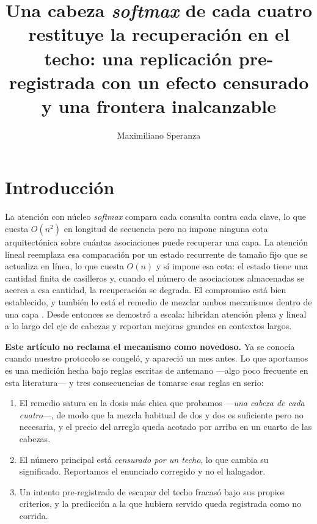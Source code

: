 \documentclass[jou,11pt,donotrepeattitle]{apa7}
\title{Una cabeza \emph{softmax} de cada cuatro restituye la recuperaci\'on en el techo:
una replicaci\'on pre-registrada con un efecto censurado y una frontera inalcanzable}
\author{Maximiliano Speranza}
\affiliation{Investigador independiente, Argentina}
\begin{document}
\maketitle

\section{Introducci\'on}

La atenci\'on con n\'ucleo \emph{softmax} compara cada consulta contra cada clave, lo que cuesta
$O(n^2)$ en longitud de secuencia pero no impone ninguna cota arquitect\'onica sobre cu\'antas
asociaciones puede recuperar una capa. La atenci\'on lineal reemplaza esa comparaci\'on por un
estado recurrente de tama\~no fijo que se actualiza en l\'inea, lo que cuesta $O(n)$ y s\'i
impone esa cota: el estado tiene una cantidad finita de casilleros y, cuando el n\'umero de
asociaciones almacenadas se acerca a esa cantidad, la recuperaci\'on se degrada. El compromiso
est\'a bien establecido, y tambi\'en lo est\'a el remedio de mezclar ambos mecanismos dentro de
una capa \parencite{arora2023zoology,arora2024simple,yang2024gated}. Desde entonces se
demostr\'o a escala: \textcite{tan2026hydrahead} hibridan atenci\'on plena y lineal a lo largo
del eje de cabezas y reportan mejoras grandes en contextos largos.

\textbf{Este art\'iculo no reclama el mecanismo como novedoso.} Ya se conoc\'ia cuando nuestro
protocolo se congel\'o, y \textcite{tan2026hydrahead} apareci\'o un mes antes. Lo que aportamos
es una medici\'on hecha bajo reglas escritas de antemano ---algo poco frecuente en esta
literatura--- y tres consecuencias de tomarse esas reglas en serio:

\begin{enumerate}
  \item El remedio satura en la dosis m\'as chica que probamos ---\emph{una cabeza de cada
        cuatro}---, de modo que la mezcla habitual de dos y dos es suficiente pero no necesaria,
        y el precio del arreglo queda acotado por arriba en un cuarto de las cabezas.
  \item El n\'umero principal est\'a \emph{censurado por un techo}, lo que cambia su
        significado. Reportamos el enunciado corregido y no el halagador.
  \item Un intento pre-registrado de escapar del techo fracas\'o bajo sus propios criterios, y
        la predicci\'on a la que hubiera servido queda registrada como no corrida.
\end{enumerate}
\end{document}

